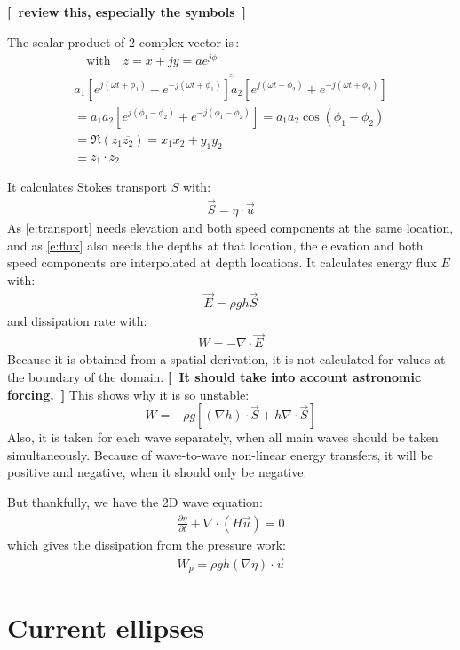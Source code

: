 \documentclass[11pt]{article} %
\providecommand{\seq}[1]{\begin{subequations}#1\end{subequations}}
\providecommand{\eqc}[1]{\begin{gather}#1\end{gather}}%
\providecommand{\seqc}[1]{\seq{\eqc{#1}}}
\providecommand{\abs}[1]{\left| #1 \right|}
\providecommand{\mean}[1]{\overline{\overline{#1}}}
\providecommand{\sqb}[1]{\left[#1\right]}%
\providecommand{\rdb}[1]{\left(#1\right)}%
\providecommand{\partialfrac}[2]{\frac{\partial #1}{\partial #2}}
\renewcommand{\vec}{\overrightarrow} %
\providecommand{\m}[1]{\mathbf{#1}}
\providecommand{\e}[1]{e^{#1}}
\providecommand{\spacedtext}[1]{\quad\text{#1}\quad}
\providecommand{\mynote}[1]{{\color[rgb]{1,.4,0}\sffamily\bfseries[~#1~]}}%
\providecommand{\mynote}[1]{}%
\begin{document}
\begin{multicols}{2}
\mynote{review this, especially the symbols}

The scalar product of 2 complex vector is\,:
\seqc{
 \spacedtext{with}z=x+jy=a\e{j\phi} \\
 \overline{\overline{a_1\sqb{\e{j(\omega t+\phi_1)}+\e{-j(\omega t+\phi_1)}} a_2\sqb{\e{j(\omega t+\phi_2)}+\e{-j(\omega t+\phi_2)}}}} \\
 = a_1 a_2\sqb{\e{j(\phi_1-\phi_2)}+\e{-j(\phi_1-\phi_2)}}
 = a_1 a_2\cos(\phi_1-\phi_2) \\
 = \Re{\left(z_1\overline{z_2}\right)}
 = x_1 x_2 + y_1 y_2 \\
 \equiv z_1 \cdot z_2
 }

It calculates Stokes transport $S$ with:
\begin{gather}
\overrightarrow{S} = \eta \cdot \overrightarrow{u} \label{e:transport}
\end{gather}
As \eqref{e:transport} needs elevation and both speed components at the same location,
and as \eqref{e:flux} also needs the depths at that location,
the elevation and both speed components are interpolated at depth locations.
It calculates energy flux $E$ with:
\begin{gather}
\overrightarrow{E} = \rho g h \overrightarrow{S} \label{e:flux}
\end{gather}
and dissipation rate with:
\begin{gather}
W = -\nabla\cdot \overrightarrow{E}
\end{gather}
Because it is obtained from a spatial derivation, it is not calculated for values at the boundary of the domain.
\mynote{It should take into account astronomic forcing.}
This shows why it is so unstable:
  $$ W = -\rho g \sqb{ \rdb{\nabla h} \cdot \overrightarrow{S} + h \nabla \cdot \overrightarrow{S} } $$
Also, it is taken for each wave separately, when all main waves should be taken simultaneously.
Because of wave-to-wave non-linear energy transfers, it will be positive and negative, when it should only be negative.

But thankfully, we have the 2D wave equation:
\eqc{
  \partialfrac{\eta}{t}+\nabla\cdot\rdb{H\vec{u}} =0
  }
which gives the dissipation from the pressure work:
\eqc{
  W_p=\rho g h (\nabla \eta) \cdot \vec{u}
  }

\iffalse
It calculates $C_d$ with:
\eqc{
  C_d = \frac{W}{\abs{\m{u}}_{max} \mean{\abs{\m{u}}^2}} \\
  C_d = \frac{W}{u \cdot \sqb{\abs{u}}u}
  }
\fi

\section{Current ellipses}


\end{multicols}
\end{document}
